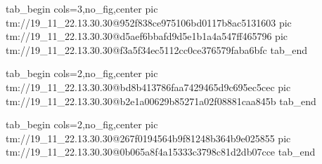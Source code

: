  
 
 
 
 

\qqSecCmtScr


\ifcmt
  tab_begin cols=3,no_fig,center
    pic tm://19_11_22.13.30.30@952f838ce975106bd0117b8ac5131603
    pic tm://19_11_22.13.30.30@d5aef6bbafd9d5e1b1a4a547ff465796
    pic tm://19_11_22.13.30.30@f3a5f34ec5112cc0ce376579faba6bfc
  tab_end
\fi


\ifcmt
  tab_begin cols=2,no_fig,center
    pic tm://19_11_22.13.30.30@bd8b413786faa7429465d9c695ec5cec
    pic tm://19_11_22.13.30.30@b2e1a00629b85271a02f08881caa845b
  tab_end
\fi


\ifcmt
  tab_begin cols=2,no_fig,center
    pic tm://19_11_22.13.30.30@267f0194564b9f81248b364b9e025855
    pic tm://19_11_22.13.30.30@0b065a8f4a15333c3798c81d2db07cce
  tab_end
\fi

